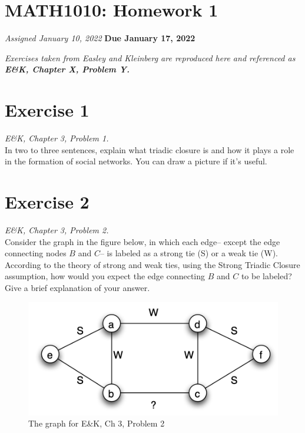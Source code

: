 \documentclass{tufte-handout}
\newcommand{\solution}[1]{
\begin{adjustwidth}{1cm}{}
\textit{\color{SolutionColor} #1}
\end{adjustwidth}}
\begin{document}
\begin{fullwidth} 
\section{MATH1010: Homework 1}
    \textit{Assigned January 10, 2022}
    \textbf{Due January 17, 2022}
    \vspace{.2cm}
    
\noindent\textit{Exercises taken from Easley and Kleinberg are reproduced here and referenced as \textbf{E\&K, Chapter X, Problem Y.}}    
    
\section*{\textbf{Exercise 1}}
\textit{E\&K, Chapter 3, Problem 1.}\\
In two to three sentences, explain what triadic closure is and how it plays a role in the formation of social networks. You can draw a picture if it's useful.
\section*{\textbf{Exercise 2}}
\textit{E\&K, Chapter 3, Problem 2.}\\
Consider the graph in the figure below, in which each edge-- except the edge connecting nodes $B$ and $C$-- is labeled as a strong tie (S) or a weak tie (W). \\
According to the theory of strong and weak ties, using the Strong Triadic Closure assumption, how would you expect the edge connecting $B$ and $C$ to be labeled? Give a brief explanation of your answer.
\begin{figure}[!h]
    \centering
    \includegraphics[width = .4\textwidth]{ek32.png}
    \caption{The graph for E\&K, Ch 3, Problem 2}
\end{figure}

\end{fullwidth}
\end{document}
